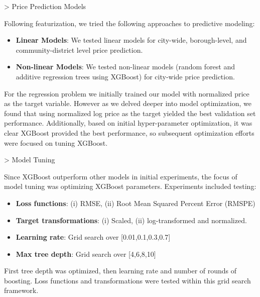 \documentclass[a0,final]{a0poster}
\newenvironment{Section}[1]				%
{
\par 
\flushleft
\colorbox{boxcol}{%
\sffamily\large\color{headingcol}> \color{white} #1%
\hspace{0.5cm}}
\par\nobreak 
\nointerlineskip 						%
\setlength\parskip{-1pt}					%
\begin{lrbox}\envbox						%
\begin{minipage}{0.95\columnwidth}		%
}
{\par
\end{minipage}\end{lrbox}				%
\fcolorbox{boxcol}{fillcol}{\usebox\envbox}	%
\vspace{1cm}							%
}
\begin{document}
\begin{multicols}{3}
\begin{Section}{Price Prediction Models}
Following featurization, we tried the following approaches to predictive modeling:
\begin{itemize}
\item \textbf{Linear Models}: We tested linear models for city-wide, borough-level, and community-district level price prediction.
\item \textbf{Non-linear Models}: We tested non-linear models (random forest and additive regression trees using XGBoost) for city-wide price prediction.
\end{itemize}
For the regression problem we initially trained our model with normalized price as the target variable. However as we delved deeper into model optimization, we found that using normalized log price as the target yielded the best validation set performance. Additionally, based on initial hyper-parameter optimization, it was clear XGBoost provided the best performance, so subsequent optimization efforts were focused on tuning XGBoost.
\end{Section}


\columnbreak
\begin{Section}{Model Tuning}
Since XGBoost outperform other models in initial experiments, the focus of model tuning was optimizing XGBoost parameters. Experiments included testing:
\begin{itemize}
\item \textbf{Loss functions}: (i) RMSE, (ii) Root Mean Squared Percent Error (RMSPE)
\item \textbf{Target transformations}: (i) Scaled, (ii) log-transformed and normalized. 
\item \textbf{Learning rate}: Grid search over [0.01,0.1,0.3,0.7]
\item \textbf{Max tree depth}: Grid search over [4,6,8,10]
\end{itemize}
First tree depth was optimized, then learning rate and number of rounds of boosting. Loss functions and transformations were tested within this grid search framework.
\end{Section}


\end{multicols}
\end{document}
